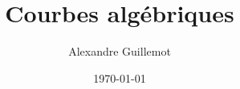 \documentclass[11pt]{report}
\begin{document}
\title{Courbes algébriques}
\date{\today}
\author{Alexandre Guillemot}
\maketitle

\tableofcontents

\pagestyle{fancy}
\fancyhf{}
\lhead{\leftmark}
\cfoot{\thepage}


\end{document}
